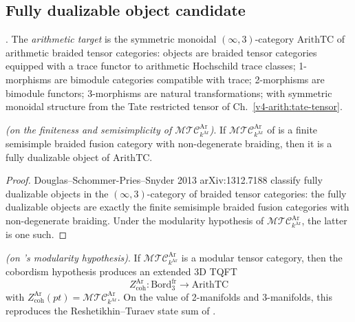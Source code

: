 \subsection{Fully dualizable object candidate}
\label{v4-arith:w10-a:cobord-candidate}

\begin{definition}
\label{v4-arith:w10-a:def:arith-target}
\ClaimStatusDefinitional. The \emph{arithmetic target} is the
symmetric monoidal \((\infty,3)\)-category
\(\mathrm{ArithTC}\) of arithmetic braided tensor categories:
objects are braided tensor categories equipped with a trace functor to
arithmetic Hochschild trace classes; 1-morphisms are bimodule
categories compatible with trace; 2-morphisms are bimodule functors;
3-morphisms are natural transformations; with symmetric monoidal
structure from the Tate restricted tensor of
Ch.~\ref{v4-arith:tate-tensor}.
\end{definition}

\begin{proposition}
\label{v4-arith:w10-a:prop:fully-dualizable-candidate}
\ClaimStatusConditional \emph{(on the finiteness and semisimplicity
of \(\mathcal{MTC}^{\mathrm{Ar}}_{k^{\mathrm{Ar}}}\))}. If
\(\mathcal{MTC}^{\mathrm{Ar}}_{k^{\mathrm{Ar}}}\)
of  is a finite semisimple
braided fusion category with non-degenerate braiding, then it is a
fully dualizable object of \(\mathrm{ArithTC}\).
\end{proposition}

\begin{proof}
Douglas--Schommer-Pries--Snyder 2013 arXiv:1312.7188 classify fully
dualizable objects in the \((\infty,3)\)-category of braided tensor
categories: the fully dualizable objects are exactly the
finite semisimple braided fusion categories with non-degenerate
braiding. Under the modularity hypothesis of
\(\mathcal{MTC}^{\mathrm{Ar}}_{k^{\mathrm{Ar}}}\), the latter is one
such.
\end{proof}

\begin{theorem}
\label{v4-arith:w10-a:thm:cobord-output}
\ClaimStatusProvedHereConditional \emph{(on
's modularity
hypothesis)}. If
\(\mathcal{MTC}^{\mathrm{Ar}}_{k^{\mathrm{Ar}}}\) is a modular tensor
category, then the cobordism hypothesis produces an extended 3D TQFT
\[
Z_{\mathrm{coh}}^{\mathrm{Ar}}:\mathrm{Bord}_{3}^{\mathrm{fr}}\to\mathrm{ArithTC}
\]
with
\(Z_{\mathrm{coh}}^{\mathrm{Ar}}(pt)=
\mathcal{MTC}^{\mathrm{Ar}}_{k^{\mathrm{Ar}}}\).
On the value of 2-manifolds and 3-manifolds, this reproduces the
Reshetikhin--Turaev state sum of
.
\end{theorem}

